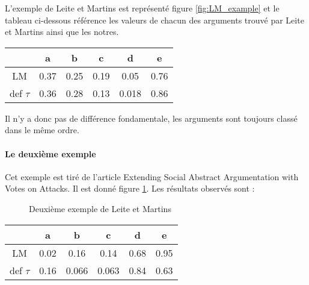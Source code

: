 \documentclass[12pt]{article}
\theoremstyle{defi}
\theoremstyle{not}
\theoremstyle{prob}
\begin{document}
L'exemple de Leite et Martins est représenté figure \ref{fig:LM_example} et le tableau ci-dessous référence les valeurs de chacun des arguments trouvé par Leite et Martins ainsi que les notres.

\begin{tabular}{|c|c|c|c|c|c|}
  \hline
             & a    & b    & c    & d     & e \\
  \hline
  LM         & 0.37 & 0.25 & 0.19 & 0.05  & 0.76 \\
  \hline
  def $\tau$ & 0.36 & 0.28 & 0.13 & 0.018 & 0.86\\
  \hline
\end{tabular}

Il n'y a donc pas de différence fondamentale, les arguments sont toujours classé dans le même ordre.

\paragraph{Le deuxième exemple\\}
Cet exemple est tiré de l'article Extending Social Abstract Argumentation with Votes on Attacks. Il est donné figure \ref{fig:LM2_example}. Les résultats observés sont :

\begin{figure}
\centering
{}
\color{blue}
\caption{Deuxième exemple de Leite et Martins}
\label{fig:LM2_example}
\end{figure}

\begin{tabular}{|c|c|c|c|c|c|}
  \hline
             & a    & b     & c     & d    & e \\
  \hline
  LM         & 0.02 & 0.16  & 0.14  & 0.68 & 0.95 \\
  \hline
  def $\tau$ & 0.16 & 0.066 & 0.063 & 0.84 & 0.63\\
  \hline
\end{tabular}
\end{document}
